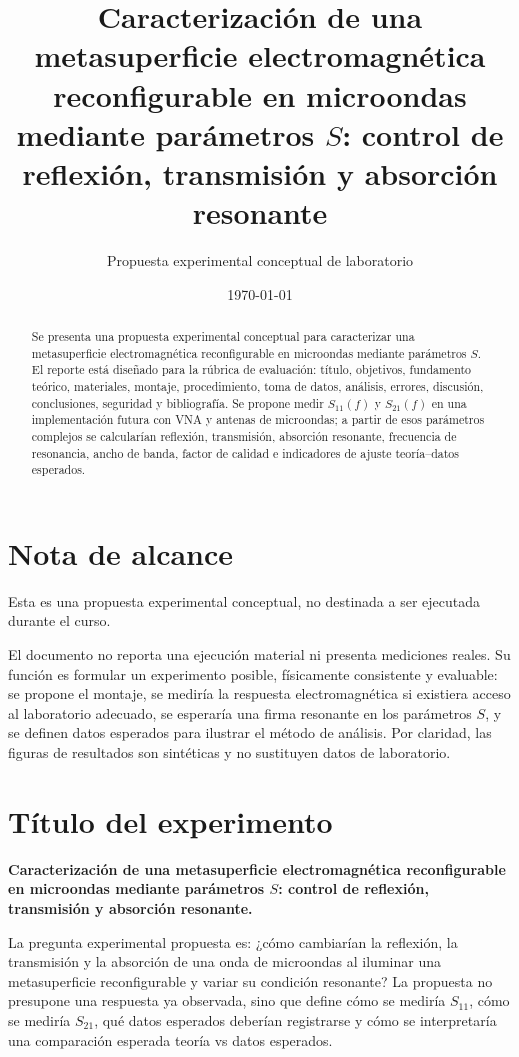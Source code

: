 \documentclass[12pt,a4paper]{article}
\title{Caracterización de una metasuperficie electromagnética reconfigurable en microondas mediante parámetros \(S\): control de reflexión, transmisión y absorción resonante}
\author{Propuesta experimental conceptual de laboratorio}
\date{\today}
\begin{document}
\maketitle

\begin{abstract}
Se presenta una propuesta experimental conceptual para caracterizar una metasuperficie electromagnética reconfigurable en microondas mediante parámetros \(S\). El reporte está diseñado para la rúbrica de evaluación: título, objetivos, fundamento teórico, materiales, montaje, procedimiento, toma de datos, análisis, errores, discusión, conclusiones, seguridad y bibliografía. Se propone medir \(S_{11}(f)\) y \(S_{21}(f)\) en una implementación futura con VNA y antenas de microondas; a partir de esos parámetros complejos se calcularían reflexión, transmisión, absorción resonante, frecuencia de resonancia, ancho de banda, factor de calidad e indicadores de ajuste teoría--datos esperados.
\end{abstract}

\section*{Nota de alcance}

Esta es una propuesta experimental conceptual, no destinada a ser ejecutada durante el curso.

El documento no reporta una ejecución material ni presenta mediciones reales. Su función es formular un experimento posible, físicamente consistente y evaluable: se propone el montaje, se mediría la respuesta electromagnética si existiera acceso al laboratorio adecuado, se esperaría una firma resonante en los parámetros \(S\), y se definen datos esperados para ilustrar el método de análisis. Por claridad, las figuras de resultados son sintéticas y no sustituyen datos de laboratorio.

\section{Título del experimento}

\textbf{Caracterización de una metasuperficie electromagnética reconfigurable en microondas mediante parámetros \(S\): control de reflexión, transmisión y absorción resonante.}

La pregunta experimental propuesta es: ¿cómo cambiarían la reflexión, la transmisión y la absorción de una onda de microondas al iluminar una metasuperficie reconfigurable y variar su condición resonante? La propuesta no presupone una respuesta ya observada, sino que define cómo se mediría \(S_{11}\), cómo se mediría \(S_{21}\), qué datos esperados deberían registrarse y cómo se interpretaría una comparación esperada teoría vs datos esperados.
\end{document}
